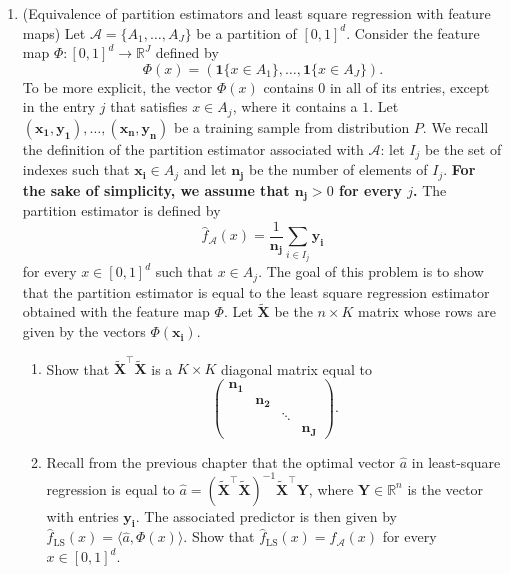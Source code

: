 \documentclass[12pt]{article}
\renewcommand{\b}[1]{\mathbf{#1 }}
\newcommand{\dotp}[1]{\langle #1 \rangle}
\newcommand{\ones}{\mathbf{1}}
\newcommand{\R}{\mathbb{R}}
\renewcommand{\AA}{\mathcal{A}}
\begin{document}
\begin{enumerate}
\item (Equivalence of partition estimators and least square regression with feature maps) Let $\AA=\{A_1,\dots,A_J\}$ be a partition of $[0,1]^d$. Consider the feature map $\Phi:[0,1]^d \to \R^J$ defined by 
\begin{equation}
\Phi(x) = (\ones\{x\in A_1\},\dots,\ones\{x\in A_J\}).
\end{equation}
To be more explicit, the vector $\Phi(x)$ contains $0$ in all of its entries, except  in the entry $j$ that satisfies $x\in A_j$, where it contains a $1$. Let $(\b{x_1},\b{y_1}),\dots,(\b{x_n},\b{y_n})$ be a training sample from distribution $P$. We recall the definition of the partition estimator associated with $\AA$: let $I_j$ be the set of indexes such that $\b{x_i}\in A_j$ and let $\b{n_j}$ be the number of elements of $I_j$. \textbf{For the sake of simplicity, we assume that $\b{n_j}>0$ for every $j$.} The partition estimator is defined by
\[ \hat f_\AA(x) = \frac{1}{\b{n_j}} \sum_{i\in I_j}\b{y_i}\]
for every $x\in[0,1]^d$ such that $x\in A_j$. The goal of this problem is to show that the partition estimator is equal to the least square regression estimator obtained with the feature map $\Phi$. Let $\b{\tilde X}$ be the $n\times K$ matrix whose rows are given by the vectors $\Phi(\b{x_i})$.
\begin{enumerate}
\item Show that $\b{\tilde X}^\top \b{\tilde X}$ is a $K\times K$ diagonal matrix equal to 
\[ \begin{pmatrix}
\b{n_1} & 			& 		& \\
 		& \b{n_2}	&		& \\
 		&			& \ddots& \\
 		&			&		& \b{n_J}
\end{pmatrix}.\]
\item Recall from the previous chapter that the optimal vector $\hat a$ in least-square regression is equal to $\hat a = (\b{\tilde X}^\top \b{\tilde X})^{-1} \b{\tilde X}^\top \b{Y}$, where $\b{Y}\in \R^n$ is the vector with entries $\b{y_i}$. The associated predictor is then given by $\hat f_{\mathrm{LS}} (x) = \dotp{\hat a,\Phi(x)}$. Show that $\hat f_{\mathrm{LS}} (x) =\hat f_\AA(x)$ for every $x\in [0,1]^d$.
\end{enumerate}




\end{enumerate}
\end{document}
